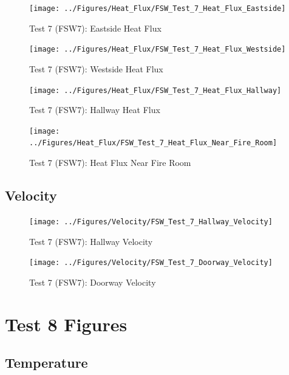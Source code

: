 \documentclass[12pt,oneside]{book}
\begin{document}
\begin{figure}[!ht]
	\texttt{[image: ../Figures/Heat\_Flux/FSW\_Test\_7\_Heat\_Flux\_Eastside]}
	\caption{Test 7 (FSW7): Eastside Heat Flux}
	\label{fig:Test_7_Eastside_Heat_Flux}
\end{figure}

\begin{figure}[!ht]
	\texttt{[image: ../Figures/Heat\_Flux/FSW\_Test\_7\_Heat\_Flux\_Westside]}
	\caption{Test 7 (FSW7): Westside Heat Flux}
	\label{fig:Test_7_Westside_Heat_Flux}
\end{figure}

\begin{figure}[!ht]
	\texttt{[image: ../Figures/Heat\_Flux/FSW\_Test\_7\_Heat\_Flux\_Hallway]}
	\caption{Test 7 (FSW7): Hallway Heat Flux}
	\label{fig:Test_7_Hallway_Heat_Flux}
\end{figure}

\begin{figure}[!ht]
	\texttt{[image: ../Figures/Heat\_Flux/FSW\_Test\_7\_Heat\_Flux\_Near\_Fire\_Room]}
	\caption{Test 7 (FSW7): Heat Flux Near Fire Room}
	\label{fig:Test_7_Heat_Flux_Near_Fire_Room}
\end{figure}

\subsection{Velocity}
\label{subsec:Velocity}

\begin{figure}[!ht]
	\texttt{[image: ../Figures/Velocity/FSW\_Test\_7\_Hallway\_Velocity]}
	\caption{Test 7 (FSW7): Hallway Velocity}
	\label{fig:Test_7_Hallway_Velocity}
\end{figure}

\begin{figure}[!ht]
	\texttt{[image: ../Figures/Velocity/FSW\_Test\_7\_Doorway\_Velocity]}
	\caption{Test 7 (FSW7): Doorway Velocity}
	\label{fig:Test_7_Doorway_Velocity}
\end{figure}

\clearpage

\section{Test 8 Figures}
\label{subsec:Test_8_Figures}

\subsection{Temperature}
\label{subsec:Temperature}
\end{document}
